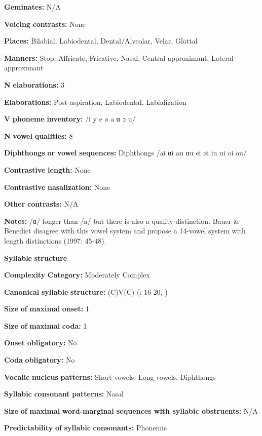 \textbf{Geminates:} N/A

\textbf{Voicing} \textbf{contrasts:} None

\textbf{Places:} Bilabial, Labiodental, Dental/Alveolar, Velar, Glottal

\textbf{Manners:} Stop, Affricate, Fricative, Nasal, Central approximant, Lateral approximant

\textbf{N} \textbf{elaborations:} 3

\textbf{Elaborations:} Post-aspiration, Labiodental, Labialization

\textbf{V} \textbf{phoneme} \textbf{inventory:} /i y e ø a ɑ ɔ u/

\textbf{N} \textbf{vowel} \textbf{qualities:} 8

\textbf{Diphthongs} \textbf{or} \textbf{vowel} \textbf{sequences:} Diphthongs /ai ɑi au ɑu ei øi iu ui oi ou/

\textbf{Contrastive} \textbf{length:} None

\textbf{Contrastive} \textbf{nasalization:} None

\textbf{Other} \textbf{contrasts:} N/A

\textbf{Notes:} /ɑ/ longer than /a/ but there is also a quality distinction. Bauer \& Benedict disagree with this vowel system and propose a 14-vowel system with length distinctions (1997: 45-48).

\textbf{Syllable} \textbf{structure}

\textbf{Complexity} \textbf{Category:} Moderately Complex

\textbf{Canonical} \textbf{syllable} \textbf{structure:} (C)V(C) (\citealt{MatthewsYip1994}: 16-20, \citealt{BauerBenedict1997})

\textbf{Size} \textbf{of} \textbf{maximal} \textbf{onset:} 1

\textbf{Size} \textbf{of} \textbf{maximal} \textbf{coda:} 1

\textbf{Onset} \textbf{obligatory:} No

\textbf{Coda} \textbf{obligatory:} No

\textbf{Vocalic} \textbf{nucleus} \textbf{patterns:} Short vowels, Long vowels, Diphthongs

\textbf{Syllabic} \textbf{consonant} \textbf{patterns:} Nasal

\textbf{Size} \textbf{of} \textbf{maximal} \textbf{word{}-marginal sequences with syllabic obstruents:} N/A

\textbf{Predictability} \textbf{of} \textbf{syllabic} \textbf{consonants:} Phonemic

